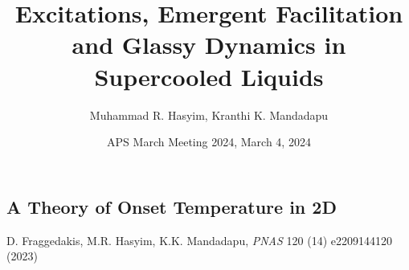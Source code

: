 \documentclass[9pt,professionalfont,t,aspectratio=169]{beamer}
\title{Excitations, Emergent Facilitation and Glassy Dynamics in Supercooled Liquids}
\date{APS March Meeting 2024, March 4, 2024}
\author{Muhammad R. Hasyim\inst{1}, Kranthi K. Mandadapu\inst{2}}
\institute[Affiliations]{
    \inst{1}%
    Department of Chemical and Biomolecular Engineering, University of California, Berkeley, CA 94720
    
    \inst{2}%
    Chemical Division, Lawrence Berkeley National Laboratory, Berkeley, CA 94720
}
\begin{document}
\maketitle 










\begin{frame}
\vspace{20pt}
\section{A Theory of Onset Temperature in 2D}

\centering{}%

D. Fraggedakis, M.R. Hasyim, K.K. Mandadapu, \textit{PNAS} 120 (14) e2209144120 (2023)

\end{frame}















\end{document}
